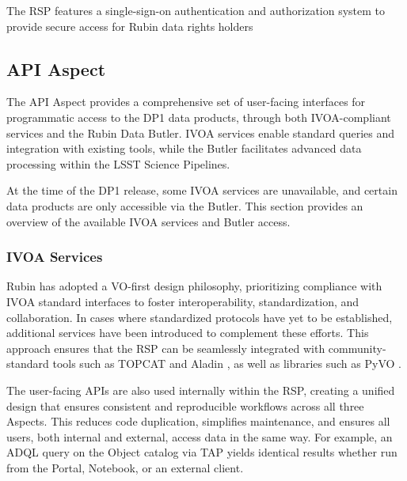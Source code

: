 The RSP features a single-sign-on authentication and authorization system to provide secure access for Rubin data rights holders \citep{rdo-013}

\subsection{API Aspect
\label{ssec:rsp_api}}
The \gls{API} Aspect provides a comprehensive set of user-facing interfaces for programmatic access to the \gls{DP1} data products, through both \gls{IVOA}-compliant services and the Rubin Data Butler. IVOA services enable standard queries and integration with existing tools, while the Butler facilitates advanced data processing within the \gls{LSST Science Pipelines}.

At the time of the \gls{DP1} release, some \gls{IVOA} services are unavailable, and certain data products are only accessible via the Butler.
This section provides an overview of the available \gls{IVOA} services and Butler access.

\subsubsection{IVOA Services
\label{sssec:ivoa_services}}

Rubin has adopted a \gls{VO}-first design philosophy, prioritizing compliance with \gls{IVOA} standard interfaces to foster interoperability, standardization, and collaboration.
In cases where standardized protocols have yet to be established, additional services have been introduced to complement these efforts.
This approach ensures that the RSP can be seamlessly integrated with community-standard tools such as TOPCAT \citep{2011ascl.soft01010T} and Aladin \citep{2000A&AS..143...33B, 2014ASPC..485..277B, 2022ASPC..532....7B}, as well as libraries such as  PyVO \citep{2014ascl.soft02004G}.

The user-facing \glspl{API} are also used internally within the \gls{RSP}, creating a unified design that ensures consistent and reproducible workflows across all three Aspects.
This reduces code duplication, simplifies maintenance, and ensures all users, both internal and external, access data in the same way.
For example, an \gls{ADQL} query on the \gls{Object} catalog via TAP yields identical results whether run from the Portal, Notebook, or an external client.

